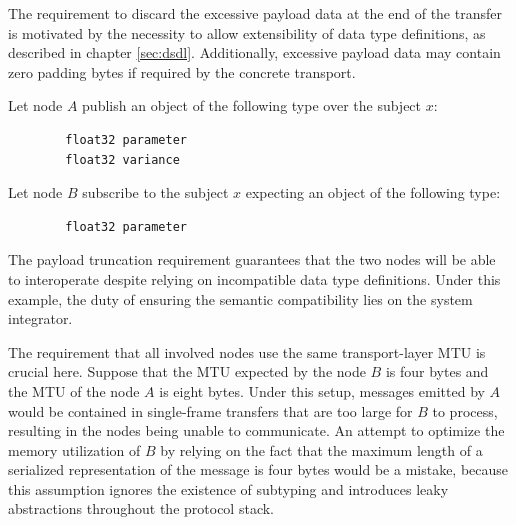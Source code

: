 \begin{remark}[breakable]
    The requirement to discard the excessive payload data at the end of the transfer is motivated by
    the necessity to allow extensibility of data type definitions, as described in chapter \ref{sec:dsdl}.
    Additionally, excessive payload data may contain zero padding bytes if required by the concrete transport.

    Let node $A$ publish an object of the following type over the subject $x$:

    \begin{verbatim}
        float32 parameter
        float32 variance
    \end{verbatim}

    Let node $B$ subscribe to the subject $x$ expecting an object of the following type:

    \begin{verbatim}
        float32 parameter
    \end{verbatim}

    The payload truncation requirement guarantees that the two nodes will be able to interoperate despite
    relying on incompatible data type definitions.
    Under this example, the duty of ensuring the semantic compatibility lies on the system integrator.

    The requirement that all involved nodes use the same transport-layer MTU is crucial here.
    Suppose that the MTU expected by the node $B$ is four bytes and the MTU of the node $A$ is eight bytes.
    Under this setup, messages emitted by $A$ would be contained in single-frame transfers that are too large
    for $B$ to process, resulting in the nodes being unable to communicate.
    An attempt to optimize the memory utilization of $B$ by relying on the fact that the maximum length of a
    serialized representation of the message is four bytes would be a mistake, because this assumption ignores
    the existence of subtyping and introduces leaky abstractions throughout the protocol stack.
\end{remark}

